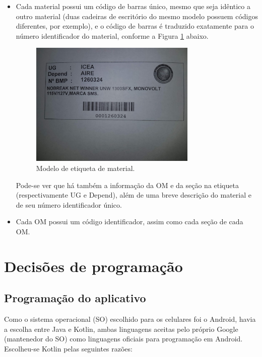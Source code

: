 \begin{itemize}

	\item Cada material possui um código de barras único, mesmo que seja idêntico a outro material (duas cadeiras de escritório do mesmo modelo possuem códigos diferentes, por exemplo), e o código de barras é traduzido exatamente para o número identificador do material, conforme a Figura \ref{projfig01} abaixo.
    
    \begin{figure}[ht!]
        \centering
        \includegraphics[width=0.75\textwidth]{Cap2/etiqueta}
        \caption{Modelo de etiqueta de material.}
        \label{projfig01}
    \end{figure}
    
    Pode-se ver que há também a informação da OM e da seção na etiqueta (respectivamente UG e Depend), além de uma breve descrição do material e de seu número identificador único.
    
    \item Cada OM possui um código identificador, assim como cada seção de cada OM.
    
\end{itemize}

\section{Decisões de programação}

\subsection{Programação do aplicativo}
Como o sistema operacional (SO) escolhido para os celulares foi o Android, havia a escolha entre Java e Kotlin, ambas linguagens aceitas pelo próprio Google (mantenedor do SO) como linguagens oficiais para programação em Android. Escolheu-se Kotlin pelas seguintes razões:

